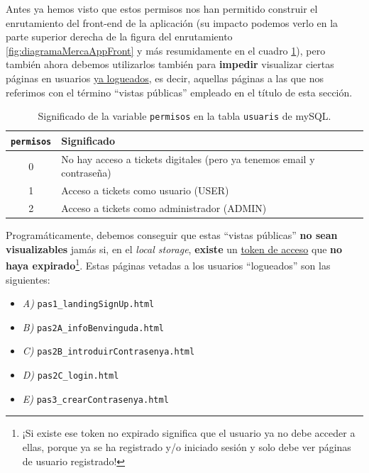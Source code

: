 \documentclass[a4paper,12pt]{report}
\begin{document}
	Antes ya hemos visto que estos permisos nos han permitido construir el enrutamiento del front-end de la aplicación (su impacto podemos verlo en la parte superior derecha de la figura del enrutamiento \ref{fig:diagramaMercaAppFront} y más resumidamente en el cuadro \ref{table:permisos}), pero también ahora debemos utilizarlos también para \textbf{impedir} visualizar ciertas páginas en usuarios \underline{ya logueados}, es decir, aquellas páginas a las que nos referimos con el término ``vistas públicas'' empleado en el título de esta sección.
	
	\begin{table}[H]
		\centering
		\caption{Significado de la variable \texttt{permisos} en la tabla \texttt{usuaris} de mySQL.}
		\begin{tabular}{|c|l|}
			\hline
			\textbf{\texttt{permisos}} & \textbf{Significado} \\
			\hline
			0 & No hay acceso a tickets digitales (pero ya tenemos email y contraseña) \\
			1 & Acceso a tickets como usuario (USER) \\
			2 & Acceso a tickets como administrador (ADMIN) \\
			\hline
		\end{tabular}
		\label{table:permisos}
		
	\end{table}
	
	Programáticamente, debemos conseguir que estas ``vistas públicas'' \textbf{no sean visualizables} jamás si, en el \textit{local storage}, \textbf{existe}  un \underline{token de acceso} que \textbf{no haya expirado}\footnote{¡Si existe ese token no expirado significa que el usuario ya no debe acceder a ellas, porque ya se ha registrado y/o iniciado sesión y solo debe ver páginas de usuario registrado!}. Estas páginas vetadas a los usuarios ``logueados'' son las siguientes:
	
	\vspace{0em}
	\begin{itemize}
		\setlength{\itemsep}{-.5em}
		\item \textit{A)} \texttt{pas1\_landingSignUp.html}
		\item \textit{B)} \texttt{pas2A\_infoBenvinguda.html}
		\item \textit{C)} \texttt{pas2B\_introduirContrasenya.html}
		\item \textit{D)} \texttt{pas2C\_login.html}
		\item \textit{E)} \texttt{pas3\_crearContrasenya.html}
	\end{itemize}
	
\end{document}
